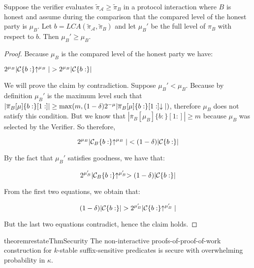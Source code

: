 \begin{lemma}
Suppose the verifier evaluates $\tilde\pi_\mathcal{A} \geq \tilde\pi_B$ in a protocol interaction where $B$ is honest and assume during the comparison that the compared level of the honest party is $\mu_B$.
Let $b = LCA(\tilde\pi_\mathcal{A}, \tilde\pi_B)$ and
let $\mu_B'$ be the full level of $\pi_B$ with respect to $b$.
Then $\mu_B' \geq \mu_B$.
\end{lemma}
\begin{proof}
    Because $\mu_B$ is the compared level of the honest party we have:

    $2^{\mu_B}|\mathcal{C}\{b:\}\negthickspace\uparrow^{\mu_B}| > 2^{\mu_B}|\mathcal{C}\{b:\}|$

    We will prove the claim by contradiction. Suppose $\mu_B' < \mu_B$. Because
    by definition $\mu_B'$ is the maximum level such that
    $|\overline\pi_B[\mu]\{b:\}[1:]| \geq \max(m, (1 -
    \delta)2^{-\mu}|\overline\pi_B[\mu]\{b:\}[1:]\negthickspace\downarrow|)$, therefore
    $\mu_B$ does not satisfy this condition. But we know that
    $|\overline\pi_B[\mu_B]\{b:\}[1:]| \geq m$ because $\mu_B$ was selected by
    the Verifier. So therefore,

    \begin{equation}
    2^{\mu_B}|\mathcal{C}_B\{b:\}\negthickspace\uparrow^{\mu_B}| < (1 - \delta)|\mathcal{C}\{b:\}|
    \end{equation}

    By the fact that $\mu_B'$ satisfies goodness, we have that:

    \begin{equation}
    2^{\mu_B'}|\mathcal{C}_B\{b:\}\negthickspace\uparrow^{\mu_B'} > (1 - \delta)|\mathcal{C}\{b:\}|
    \end{equation}

    From the first two equations, we obtain that:

    \begin{equation}
    (1 - \delta)|\mathcal{C}\{b:\}| > 2^{\mu_B'}|\mathcal{C}\{b:\}\negthickspace\uparrow^{\mu_B'}|
    \end{equation}

    But the last two equations contradict, hence the claim holds.
\end{proof}

\begin{restatable}{theorem}{restateThmSecurity}
    \label{thm.security}
    The non-interactive proofs-of-proof-of-work construction for $k$-stable
    suffix-sensitive predicates is secure with overwhelming probability in
    $\kappa$.
\end{restatable}

